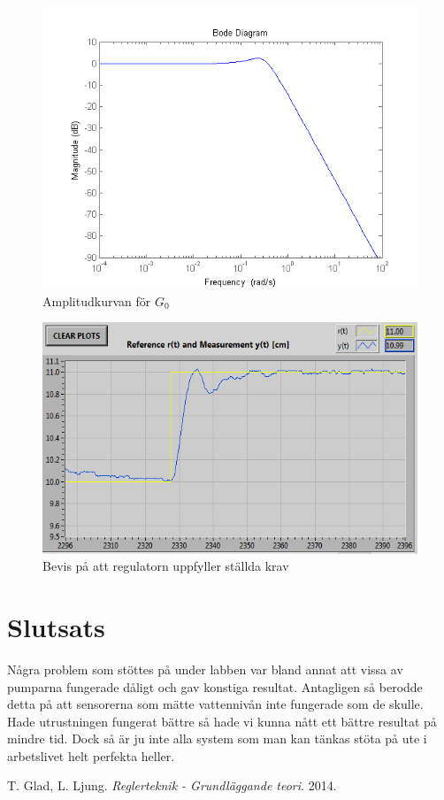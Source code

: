 \documentclass[a4paper]{article}
\begin{document}
\begin{figure}[!ht]
  \centering
  \includegraphics{bodemagG}
  \caption{Amplitudkurvan för $G_0$}
\end{figure}
\newpage

\begin{figure}[ht!]
  \centering
  \includegraphics[scale=1]{lab2-the-best}  
  \caption{Bevis på att regulatorn uppfyller ställda krav}
\end{figure}
\newpage

\section{Slutsats}

Några problem som stöttes på under labben var bland annat att vissa av pumparna fungerade dåligt och gav konstiga resultat.
Antagligen så berodde detta på att sensorerna som mätte vattennivån inte fungerade som de skulle.
Hade utrustningen fungerat bättre så hade vi kunna nått ett bättre resultat på mindre tid.
Dock så är ju inte alla system som man kan tänkas stöta på ute i arbetslivet helt perfekta heller. 

\begin{thebibliography}{9}
    T. Glad, L. Ljung. 
    \emph{Reglerteknik - Grundläggande teori}.
    2014.
\end{thebibliography}
\end{document}
